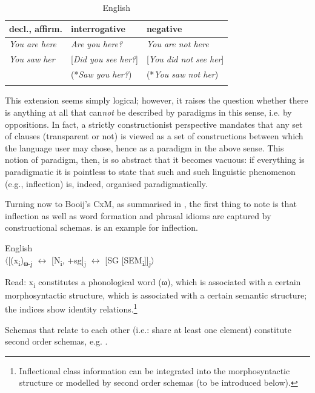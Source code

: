 \documentclass[output=paper]{langsci/langscibook}
\begin{document}
\begin{table}
\caption{English \citep[662]{Haspelmath2000}\label{tab:reiner:e20}}
\begin{tabular}{lll}
\lsptoprule
decl., affirm. & interrogative & negative\\
\midrule
\textit{You are here} & \textit{Are you here?} & \textit{You are not here}\\
\textit{You saw her} & [\textit{Did you see her?}] & [\textit{You did not see her}]\\
& (*\textit{Saw you her?}) & (*\textit{You saw not her})\\
\lspbottomrule
\end{tabular}
\end{table}


This extension seems simply logical; however, it raises the question whether there is anything at all that can\textit{not} be described by paradigms in this sense, i.e. by oppositions. In fact, a strictly constructionist perspective mandates that any set of clauses (transparent or not) is viewed as a set of constructions between which the language user may chose, hence as a paradigm in the above sense. This notion of paradigm, then, is so abstract that it becomes vacuous: if everything is paradigmatic it is pointless to state that such and such linguistic phenomenon (e.g., inflection) is, indeed, organised paradigmatically.

Turning now to Booij’s CxM, as summarised in \citet{Booij2016}, the first thing to note is that inflection as well as word formation and phrasal idioms are captured by constructional schemas.  is an example for inflection.

\ea \label{ex:reiner:21}
{English \citep[440, number (37) there]{Booij2016}}\\
  〈[(x\textsubscript{i})\textsubscript{ω-j} $\leftrightarrow $ [N\textsubscript{i}, +sg]\textsubscript{j} $\leftrightarrow $ [SG [SEM\textsubscript{i}]]\textsubscript{j}〉
\z

Read: x\textsubscript{i} constitutes a phonological word (ω), which is associated with a certain morphosyntactic structure, which is associated with a certain semantic structure; the indices show identity relations.\footnote{Inflectional class information can be integrated into the morphosyntactic structure or modelled by second order schemas (to be introduced below).}

Schemas that relate to each other (i.e.: share at least one element) constitute second order schemas, e.g. .
\end{document}
